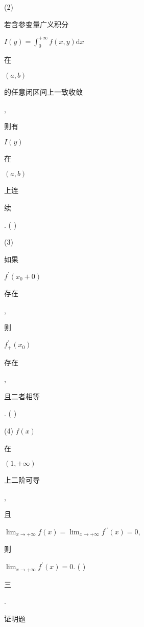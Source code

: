 \documentclass[10pt]{article}
\begin{document}
(2) \begin{CJK}{UTF8}{mj}若含参变量广义积分\end{CJK} $I(y)=\int_{0}^{+\infty} f(x, y) \mathrm{d} x$ \begin{CJK}{UTF8}{mj}在\end{CJK} $(a, b)$ \begin{CJK}{UTF8}{mj}的任意闭区间上一致收敛\end{CJK}, \begin{CJK}{UTF8}{mj}则有\end{CJK} $I(y)$ \begin{CJK}{UTF8}{mj}在\end{CJK} $(a, b)$ \begin{CJK}{UTF8}{mj}上连\end{CJK} \begin{CJK}{UTF8}{mj}续\end{CJK}. ( )

(3) \begin{CJK}{UTF8}{mj}如果\end{CJK} $f^{\prime}\left(x_{0}+0\right)$ \begin{CJK}{UTF8}{mj}存在\end{CJK}, \begin{CJK}{UTF8}{mj}则\end{CJK} $f_{+}^{\prime}\left(x_{0}\right)$ \begin{CJK}{UTF8}{mj}存在\end{CJK}, \begin{CJK}{UTF8}{mj}且二者相等\end{CJK}. ( )

(4) $f(x)$ \begin{CJK}{UTF8}{mj}在\end{CJK} $(1,+\infty)$ \begin{CJK}{UTF8}{mj}上二阶可导\end{CJK}, \begin{CJK}{UTF8}{mj}且\end{CJK} $\lim _{x \rightarrow+\infty} f(x)=\lim _{x \rightarrow+\infty} f^{\prime \prime}(x)=0$, \begin{CJK}{UTF8}{mj}则\end{CJK} $\lim _{x \rightarrow+\infty} f^{\prime}(x)=0$. ( )

\begin{CJK}{UTF8}{mj}三\end{CJK}. \begin{CJK}{UTF8}{mj}证明题\end{CJK}
\end{document}
